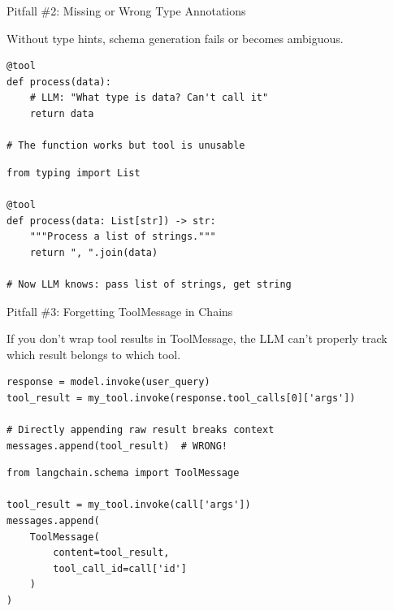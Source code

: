 \documentclass[aspectratio=169,11pt]{beamer}
\begin{document}
\begin{frame}[fragile,shrink=2]{Pitfall \#2: Missing or Wrong Type Annotations}
\begin{warningbox}
Without type hints, schema generation fails or becomes ambiguous.
\end{warningbox}

\begin{codebox}
\begin{lstlisting}
@tool
def process(data):
    # LLM: "What type is data? Can't call it"
    return data

# The function works but tool is unusable
\end{lstlisting}
\end{codebox}

\begin{codebox}
\begin{lstlisting}
from typing import List

@tool
def process(data: List[str]) -> str:
    """Process a list of strings."""
    return ", ".join(data)

# Now LLM knows: pass list of strings, get string
\end{lstlisting}
\end{codebox}
\end{frame}

\begin{frame}[fragile,shrink=2]{Pitfall \#3: Forgetting ToolMessage in Chains}
\begin{warningbox}
If you don't wrap tool results in ToolMessage, the LLM can't properly track which result belongs to which tool.
\end{warningbox}

\begin{codebox}
\begin{lstlisting}
response = model.invoke(user_query)
tool_result = my_tool.invoke(response.tool_calls[0]['args'])

# Directly appending raw result breaks context
messages.append(tool_result)  # WRONG!
\end{lstlisting}
\end{codebox}

\begin{codebox}
\begin{lstlisting}
from langchain.schema import ToolMessage

tool_result = my_tool.invoke(call['args'])
messages.append(
    ToolMessage(
        content=tool_result,
        tool_call_id=call['id']
    )
)
\end{lstlisting}
\end{codebox}
\end{frame}
\end{document}
